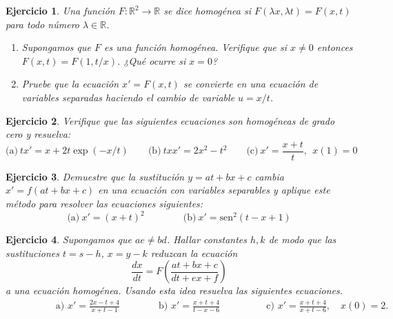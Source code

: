 \documentclass[11pt,a4paper,pdftex]{amsart}
\newtheorem{ej}{Ejercicio}%
\numberwithin{equation}{section}%
\newcommand{\bej}[1]{\begin{ej}\rm{#1}}
\newcommand{\eej}{\end{ej}\vspace{-0.2cm}}
\newcommand{\di}{\displaystyle}
\newcommand{\R}{\mathbb R}
\newcommand{\0}{\mathbb O}
\newcommand{\8}{\infty}
\newcommand{\sen}[1]{\mbox{sen}\;{#1}}
\begin{document}
\bigskip



\bej Una función $F: \R^2 \rightarrow \R$ se dice \emph{homogénea} si 
$F(\lambda x, \lambda t) = F(x,t)$ para todo número $\lambda \in \R$.

\begin{enumerate}
\item[(a)] Supongamos que $F$ es una función homogénea. Verifique que si $x 
\neq 0$ entonces $F(x,t) = F(1,t/x)$. ¿Qué ocurre si $x = 0$?

\item Pruebe que la ecuación $x' = F(x,t)$ se convierte en una ecuación de
variables separadas haciendo el cambio de variable $u = x/t$.
\end{enumerate}

\eej

\bigskip

\bej Verifique que las siguientes ecuaciones son homog\'eneas de
grado cero y
resuelva:
\[
\mbox{(a)}\ tx'=x+2t \exp(-x/t)\qquad \mbox{(b)}\ txx'=2x^2-t^{2}\qquad
\mbox{(c)}\ x'=\di\frac{x+t}{t},\ \ x(1)=0
\]
\eej

\bigskip

\bej Demuestre que la sustituci\'on $y=at+bx+c$ cambia
$x'=f(at+bx+c)$ en una ecuaci\'on con variables separables y
aplique este m\'etodo para resolver las ecuaciones siguientes:
$$ \mbox{(a)}\ x'=(x+t)^{2} \qquad\qquad
 \mbox{(b)}\ x'=\mbox{sen}^{2}(t-x+1) $$
\eej


\bej Supongamos que $ae \ne bd$. Hallar constantes $h, k$ de modo que las 
sustituciones $t=s-h$, $x=y -k$ reduzcan la ecuaci\'on
\[ \frac{dx}{dt}= F \left( \frac{at+bx+c}{dt+ex+f} \right) \]
a una ecuaci\'on homog\'enea. Usando esta idea resuelva las siguientes 
ecuaciones.
 \[
 \begin{aligned}&\qquad\qquad\mbox{a) } x'=\frac{2x-t+4}{x+t-1}
 \qquad \qquad\mbox{b) }x'=\frac{x+t+4}{t-x-6}
 &\qquad\qquad \mbox{c) }x'=\frac{x+t+4}{x+t-6},\quad{x(0)=2}.
 \end{aligned}
 \]
\eej

\bigskip

\end{document}
